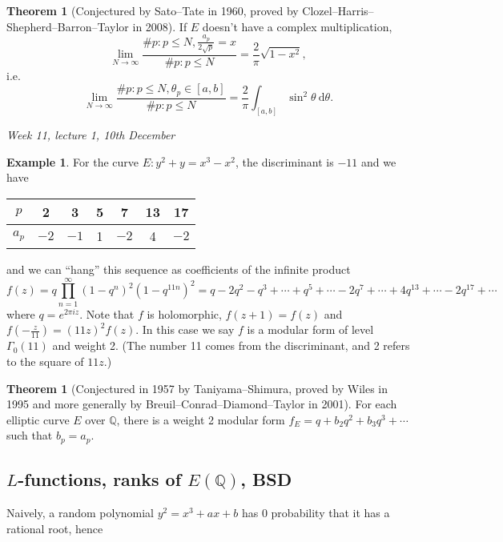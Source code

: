 \documentclass{article}
\newcommand{\Q}{\mathbb{Q}}
\theoremstyle{definition}
\newtheorem{thm}[defn]{Theorem}
\newtheorem{example}[defn]{Example}
\begin{document}
\begin{thm}[Conjectured by Sato--Tate in 1960, proved by Clozel--Harris--Shepherd--Barron--Taylor in 2008]
If $E$ doesn't have a complex multiplication,
\[
\lim_{N\rightarrow\infty}\frac{\# p:p\leq N,\frac{a_p}{2\sqrt p}=x}{\# p:p\leq N}=\frac{2}{\pi}\sqrt{1-x^2},
\]
i.e.
\[
\lim_{N\rightarrow\infty}\frac{\# p:p\leq N,\theta_p\in [a,b]}{\# p:p\leq N}=\frac{2}{\pi}\int_{[a,b]}\sin^2\theta \ \mathrm d\theta.
\]
\end{thm}

\begin{flushright}
\textit{Week 11, lecture 1, 10th December}
\end{flushright}

\begin{example}
For the curve $E:y^2+y=x^3-x^2$, the discriminant is $-11$ and we have

\begin{table}[h]
\centering
\begin{tabular}{c|cccccc}
$p$   & 2    & 3    & 5 & 7    & 13 & 17   \\ \hline
$a_p$ & $-2$ & $-1$ & 1 & $-2$ & 4  & $-2$
\end{tabular}
\end{table}

and we can ``hang'' this sequence as coefficients of the infinite product
\[
f(z)=q\prod_{n=1}^\infty (1-q^n)^2(1-q^{11n})^2=q-2q^2-q^3+\cdots+q^5+\cdots-2q^7+\cdots+4q^13+\cdots-2q^{17}+\cdots
\]
where $q=e^{2\pi iz}$. Note that $f$ is holomorphic, $f(z+1)=f(z)$ and $f\left(-\frac{z}{11}\right)=(11z)^2f(z)$. In this case we say $f$ is a modular form of level $\Gamma_0(11)$ and weight 2. (The number 11 comes from the discriminant, and 2 refers to the square of $11z$.)
\end{example}

\begin{thm}[Conjectured in 1957 by Taniyama--Shimura, proved by Wiles in 1995 and more generally by Breuil--Conrad--Diamond--Taylor in 2001]
\label{thm:taniyama-shimura}
For each elliptic curve $E$ over $\Q$, there is a weight 2 modular form $f_E=q+b_2q^2+b_3q^3+\cdots$ such that $b_p=a_p$.
\end{thm}

\subsection{$L$-functions, ranks of $E(\Q)$, BSD}
Naively, a random polynomial $y^2=x^3+ax+b$ has 0 probability that it has a rational root, hence
\end{document}
